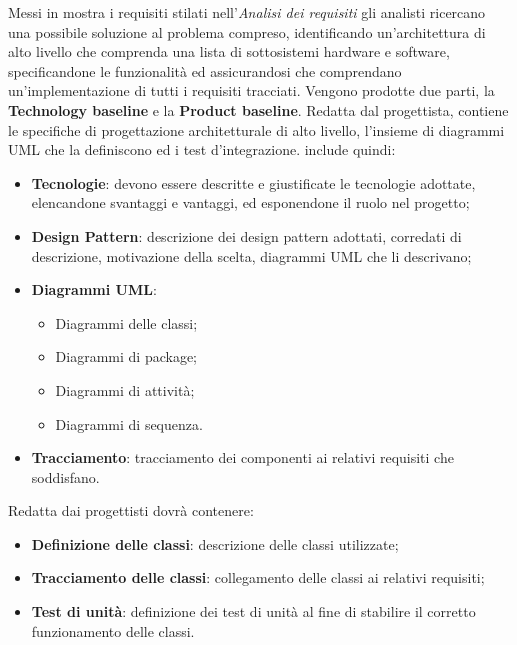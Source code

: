 		Messi in mostra i requisiti stilati nell'\textit{Analisi dei requisiti} gli analisti ricercano una possibile soluzione al problema compreso, identificando un'architettura di alto livello che comprenda una lista di sottosistemi hardware e software, specificandone le funzionalità ed assicurandosi che comprendano un'implementazione di tutti i requisiti tracciati.
		Vengono prodotte due parti, la \textbf{Technology baseline} e la \textbf{Product baseline}.
		Redatta dal progettista, contiene le specifiche di progettazione architetturale di alto livello, l'insieme di diagrammi UML che la definiscono ed i test d'integrazione.\newline
		include quindi:
		\begin{itemize}
		    \item \textbf{Tecnologie}: devono essere descritte e giustificate le tecnologie adottate, elencandone svantaggi e vantaggi, ed esponendone il ruolo nel progetto;
		    \item \textbf{Design Pattern}: descrizione dei design pattern adottati, corredati di descrizione, motivazione della scelta, diagrammi UML che li descrivano;
		    \item \textbf{Diagrammi UML}:
		    \begin{itemize}
		        \item Diagrammi delle classi;
		        \item Diagrammi di package;
		        
		        \item Diagrammi di attività;
		        \item Diagrammi di sequenza.
		    \end{itemize}
		    \item \textbf{Tracciamento}: tracciamento dei componenti ai relativi requisiti che soddisfano.
		\end{itemize}
		Redatta dai progettisti dovrà contenere:
		\begin{itemize}
		    \item \textbf{Definizione delle classi}: descrizione delle classi utilizzate;
		    \item \textbf{Tracciamento delle classi}: collegamento delle classi ai relativi requisiti;
		    \item \textbf{Test di unità}: definizione dei test di unità al fine di stabilire il corretto funzionamento delle classi.
		\end{itemize}
